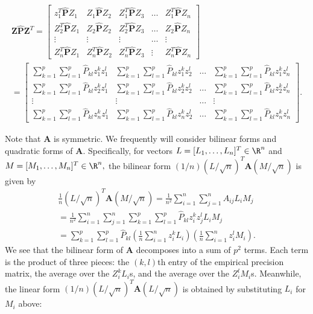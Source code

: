 \documentclass[12pt]{article}
\newcommand{\bs}[1]{\boldsymbol{#1}}
\begin{document}
\begin{multline*}
 \bs{Z}\hat{\bs{P}} \bs{Z}^T = \begin{bmatrix} z_1^T \hat{\bs{P}} Z_1 & Z_1 \hat{\bs{P}} Z_2 & Z_1^T \hat{\bs{P}} 
 Z_3 & \dots & Z_1^T \hat{\bs{P}} Z_n \\ Z_2^T \hat{\bs{P}} Z_1 & Z_2 \hat{\bs{P}} Z_2 & Z_2^T \hat{\bs{P}} Z_3 & \dots & Z_2 \hat{\bs{P}} Z_n  \\ \vdots & \vdots & \vdots & \dots & \vdots \\ Z_n^T \hat{\bs{P}} Z_1 & Z_n^T \hat{\bs{P}} Z_2 & Z^T_n \hat{\bs{P}} Z_3 & \vdots & Z_n^T \hat{\bs{P}} Z_n \end{bmatrix} \\ =  \begin{bmatrix} \sum_{k = 1}^p \sum_{l=1}^p \hat{P}_{kl} z_1^k z_1^l & \sum_{k=1}^p \sum_{l=1}^p \hat{P}_{kl} z_1^k z_2^l & \dots & \sum_{k=1}^p \sum_{l=1}^p \hat{P}_{kl} z_1^k z_n^l \\ \sum_{k = 1}^p \sum_{l=1}^p \hat{P}_{kl} z_2^k z_1^l & \sum_{k=1}^p \sum_{l=1}^p \hat{P}_{kl} z_2^k z_2^l & \dots & \sum_{k=1}^p \sum_{l=1}^p \hat{P}_{kl} z_2^k z_n^l \\ \vdots & \vdots & \dots & \vdots \\ \sum_{k = 1}^p \sum_{l=1}^p \hat{P}_{kl} z_n^k z_1^l & \sum_{k=1}^p \sum_{l=1}^p \hat{P}_{kl} z_n^k z_2^l & \dots & \sum_{k=1}^p \sum_{l=1}^p \hat{P}_{kl} z_n^k z_n^l  \end{bmatrix}.
\end{multline*}

Note that $\bs{A}$ is symmetric. We frequently will consider bilinear forms and quadratic forms of $\bs{A}$. Specifically, for vectors $L = [L_1, \dots, L_n]^T \in \R^n$ and $M = [M_1, \dots, M_n]^T \in \R^n,$ the bilinear form $(1/n) (L/\sqrt{n})^T \bs{A} (M/\sqrt{n})$ is given by
\begin{multline}\label{eqn:bilinear_form_decomp}
\frac{1}{n} (L/\sqrt{n})^T \bs{A} (M/\sqrt{n}) = \frac{1}{n^2} \sum_{i=1}^n \sum_{j=1}^n A_{ij} L_i M_j \\ = \frac{1}{n^2} \sum_{i=1}^n \sum_{j=1}^n \sum_{k=1}^p \sum_{l=1}^p \hat{P}_{kl} z^k_i z^l_j L_i M_j \\ = \sum_{k=1}^p \sum_{l=1}^p \hat{P}_{kl} \left(\frac{1}{n} \sum_{i=1}^n z_i^k L_i \right) \left( \frac{1}{n} \sum_{i=1}^n z_i^l M_i \right).
\end{multline}
We see that the bilinear form of $\bs{A}$ decomposes into a sum of $p^2$ terms. Each term is the product of three pieces: the $(k,l)$th entry of the empirical precision matrix, the average over the $Z^k_i L_i$s, and the average over the $Z^l_i M_i$s. Meanwhile, the linear form $(1/n)(L/\sqrt{n})^T \bs{A}(L/\sqrt{n})$ is obtained by substituting $L_i$ for $M_i$ above:
\end{document}
